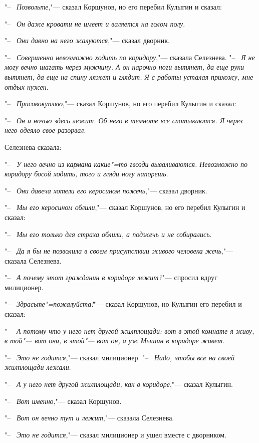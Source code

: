 "--~ \textit{Позвольте},"--- сказал Коршунов, но его перебил Кулыгин и сказал:

"--~ \textit{Он даже кровати не имеет и валяется на голом полу}.

"--~ \textit{Они давно на него жалуются},"--- сказал дворник.

"--~ \textit{Совершенно невозможно ходить по коридору},"--- сказала Селезнева. "--~ \textit{Я не могу вечно шагать через мужчину. А он нарочно ноги вытянет, да еще руки вытянет, да еще на спину ляжет и глядит. Я с работы усталая прихожу, мне отдых нужен}.

"--~ \textit{Присовокупляю},"--- сказал Коршунов, но его перебил Кулыгин и сказал:

"--~ \textit{Он и ночью здесь лежит. Об него в темноте все спотыкаются. Я через него одеяло свое разорвал}.

Селезнева сказала:

"--~ \textit{У него вечно из кармана какие"=то гвозди вываливаются. Невозможно по коридору босой ходить, того и гляди ногу напорешь}.

"--~ \textit{Они давеча хотели его керосином пожечь},"--- сказал дворник.

"--~ \textit{Мы его керосином облили},"--- сказал Коршунов, но его перебил Кулыгин и сказал:

"--~ \textit{Мы его только для страха облили, а поджечь и не собирались}.

"--~ \textit{Да я бы не позволила в своем присутствии живого человека жечь},"--- сказала Селезнева.

"--~ \textit{А почему этот гражданин в коридоре лежит?}"--- спросил вдруг милиционер.

"--~ \textit{Здрасьте"=пожалуйста!}"--- сказал Коршунов, но Кулыгин его перебил и сказал:

"--~ \textit{А потому что у него нет другой жилплощади: вот в этой комнате я живу, в той"--- вот они, в этой"--- вот он, а уж Мышин в коридоре живет}.

"--~ \textit{Это не годится},"--- сказал милиционер. "--~ \textit{Надо, чтобы все на своей жилплощади лежали}.

"--~ \textit{А у него нет другой жилплощади, как в коридоре},"--- сказал Кулыгин.

"--~ \textit{Вот именно},"--- сказал Коршунов.

"--~ \textit{Вот он вечно тут и лежит},"--- сказала Селезнева.

"--~ \textit{Это не годится},"--- сказал милиционер и ушел вместе с дворником.

